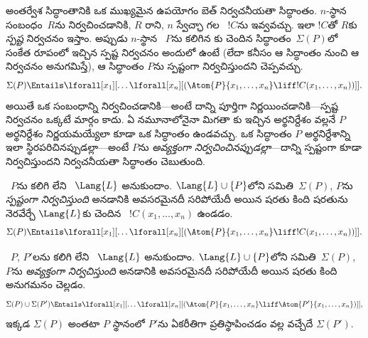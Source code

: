 \documentclass[../../../include/open-logic-section]{subfiles}
\begin{document}


అంతర్వేశ సిద్ధాంతానికి ఒక ముఖ్యమైన ఉపయోగం బెత్ నిర్వచనీయతా
సిద్ధాంతం. $n$-స్థాన సంబంధం~$R$ను నిర్వచించడానికి, $R$ రాని,
$n$ స్వేచ్ఛా  గల
~$!C$ను ఇవ్వవచ్చు. ఇలా $!C$తో
$R$కు \emph{స్పష్ట} నిర్వచనం ఇస్తాం. అప్పుడు $n$-స్థాన
~$P$ను కలిగిన
కు చెందిన సిద్ధాంతం~$\Sigma(P)$లో సంకేత రూపంలో
ఇచ్చిన స్పష్ట నిర్వచనం అందులో ఉంటే (లేదా కనీసం ఆ సిద్ధాంతం నుంచి ఆ నిర్వచనం
అనుగమిస్తే), ఆ సిద్ధాంతం $P$ను స్పష్టంగా నిర్వచిస్తుందని చెప్పవచ్చు.
\[
\Sigma(P) \Entails \lforall[x_1][\dots
  \lforall[x_n][(\Atom{P}{x_1,\dots, x_n} \liff !C(x_1, \dots,
    x_n))]].
\]
అయితే ఒక సంబంధాన్ని నిర్వచించడానికి---అంటే దాన్ని పూర్తిగా
నిర్ణయించడానికి---స్పష్ట నిర్వచనం ఒక్కటే మార్గం కాదు. ఏ నమూనాలోనైనా
మిగతా కు ఇచ్చిన అర్థనిర్దేశం వల్లనే
$P$ అర్థనిర్దేశం నిర్ణయమయ్యేలా కూడా ఒక సిద్ధాంతం ఉండవచ్చు. ఒక
సిద్ధాంతం $P$ అర్థనిర్దేశాన్ని ఇలా స్థిరపరిచినప్పుడల్లా---అంటే $P$ను
\emph{అవ్యక్తంగా నిర్వచించినప్పుడల్లా}---దాన్ని స్పష్టంగా కూడా
నిర్వచిస్తుందని నిర్వచనీయతా సిద్ధాంతం చెబుతుంది.

\begin{defn}
~$P$ను కలిగి లేని
~$\Lang{L}$ అనుకుందాం.
$\Lang{L} \cup \{P\}$లోని 
సమితి~$\Sigma(P)$, $P$ను \emph{స్పష్టంగా నిర్వచిస్తుంది} అనడానికి అవసరమైనదీ సరిపోయేదీ అయిన షరతు
కింది షరతును నెరవేర్చే $\Lang{L}$కు చెందిన
~$!C(x_1, \dots, x_n)$ ఉండడం.
\[
\Sigma(P) \Entails \lforall[x_1][\dots
  \lforall[x_n][(\Atom{P}{x_1,\dots, x_n} \liff !C(x_1, \dots,
    x_n))]].
\]
\end{defn}

\begin{defn}
~$P$, $P'$లను కలిగి లేని
~$\Lang{L}$ అనుకుందాం.
$\Lang{L} \cup \{P\}$లోని 
సమితి~$\Sigma(P)$, $P$ను \emph{అవ్యక్తంగా నిర్వచిస్తుంది} అనడానికి అవసరమైనదీ సరిపోయేదీ అయిన షరతు
కింది అనుగమనం చెల్లడం.
\[
\Sigma(P) \cup \Sigma(P') \Entails \lforall[x_1][\dots
  \lforall[x_n][(\Atom{P}{x_1,\dots, x_n} \liff \Atom{P'}{x_1,\dots,
      x_n})]],
\]
ఇక్కడ $\Sigma(P)$ అంతటా $P$ స్థానంలో $P'$ను ఏకరీతిగా
ప్రతిస్థాపించడం వల్ల వచ్చేదే $\Sigma(P')$.
\end{defn}
\end{document}
